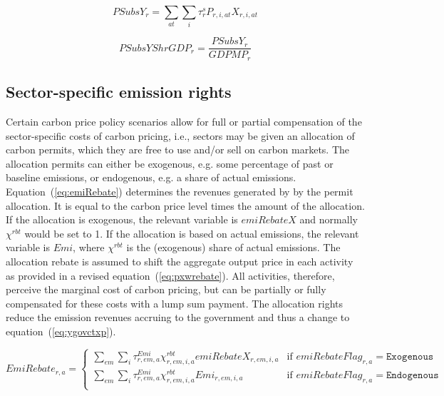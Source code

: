 \documentclass[11pt,letterpaper]{report}
\begin{document}
\begin{equation}
\label{eq:pSubsY}
\mathit{PSubsY}_r =
\sum_{\mathit{at}}
{\sum_i{\tau^s_{r} P_{r,i,\mathit{at}} X_{r,i,\mathit{at}} } }
\end{equation}

\begin{equation}
\label{eq:pSubsYShrGDP}
\mathit{PSubsYShrGDP}_r = \frac{\mathit{PSubsY}_r}{\mathit{GDPMP}_r}
\end{equation}

\subsection{Sector-specific emission rights}

Certain carbon price policy scenarios allow for full or partial
compensation of the sector-specific costs of carbon pricing, i.e.,
sectors may be given an allocation of carbon permits, which
they are free to use and/or sell on carbon markets. The allocation
permits can either be exogenous, e.g. some percentage of past
or baseline emissions, or endogenous, e.g. a share of actual
emissions. Equation~(\ref{eq:emiRebate}) determines the revenues generated by
by the permit allocation. It is equal to the carbon price level
times the amount of the allocation. If the allocation
is exogenous, the relevant variable is $\mathit{emiRebateX}$ and normally
$\chi^{\mathit{rbt}}$ would be set to 1. If the allocation is based on
actual emissions, the relevant variable is $\mathit{Emi}$, where
$\chi^{\mathit{rbt}}$ is the (exogenous) share of actual emissions.
The allocation rebate is assumed to shift the aggregate output price
in each activity as provided in a revised equation~(\ref{eq:pxwrebate}).
All activities, therefore, perceive the marginal cost of carbon
pricing, but can be partially or fully compensated for these costs
with a lump sum payment. The allocation rights reduce the emission revenues
accruing to the government and thus a change to equation~(\ref{eq:ygovctxp}).

\begin{equation}
\label{eq:emiRebate}
\mathit{EmiRebate}_{r,a} =
\begin{cases} \displaystyle
\sum_{\mathit{em}}{\sum_i{\tau^{\mathit{Emi}}_{r,\mathit{em},\mathit{a}}  \chi^{\mathit{rbt}}_{r,\mathit{em},i,a} \mathit{emiRebateX}_{r,\mathit{em},i,a}}} & \textrm{if } \mathit{emiRebateFlag}_{r,a} = \texttt{Exogenous} \\
\displaystyle
\sum_{\mathit{em}}{\sum_i{\tau^{\mathit{Emi}}_{r,\mathit{em},\mathit{a}}  \chi^{\mathit{rbt}}_{r,\mathit{em},i,a} \mathit{Emi}_{r,\mathit{em},i,a}}} & \textrm{if } \mathit{emiRebateFlag}_{r,a} = \texttt{Endogenous} \\
\end{cases}
\end{equation}
\end{document}
